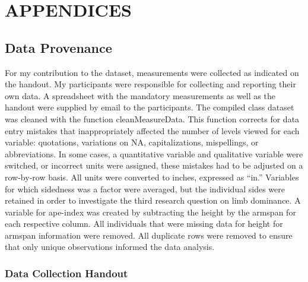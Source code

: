 \documentclass[]{article}
\begin{document}
\newpage
\section{APPENDICES}
\label{sec:appendix}

\subsection{Data Provenance}
\label{sec:appendix-data-provenance}

For my contribution to the dataset, measurements were collected as
indicated on the handout. My participants were responsible for
collecting and reporting their own data. A spreadsheet with the
mandatory measurements as well as the handout were supplied by email to
the participants. The compiled class dataset was cleaned with the
function cleanMeasureData. This function corrects for data entry
mistakes that inappropriately affected the number of levels viewed for
each variable: quotations, variations on NA, capitalizations,
mispellings, or abbreviations. In some cases, a quantitative variable
and qualitative variable were switched, or incorrect units were
assigned, these mistakes had to be adjusted on a row-by-row basis. All
units were converted to inches, expressed as ``in.'' Variables for which
sidedness was a factor were averaged, but the individual sides were
retained in order to investigate the third research question on limb
dominance. A variable for ape-index was created by subtracting the
height by the armspan for each respective column. All individuals that
were missing data for height for armspan information were removed. All
duplicate rows were removed to ensure that only unique observations
informed the data analysis.

\newpage
\subsubsection{Data Collection Handout}
\label{sec:appendix-data-handout}
\end{document}
